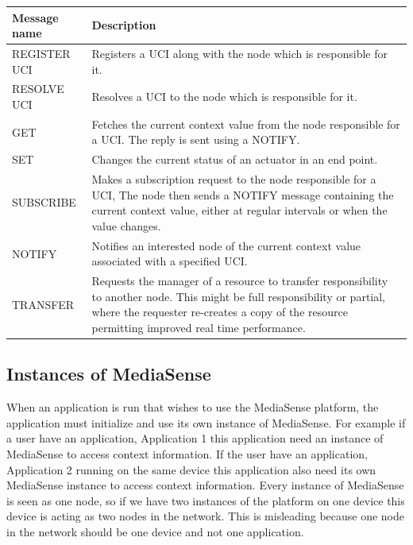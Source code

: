 \begin{center}
    \begin{tabular}{ | l | p{12cm} |}
    \hline
    Message name 		& 		Description \\ \hline
	REGISTER UCI 		& 		Registers a UCI along with the node which is responsible for it. \\ \hline
	RESOLVE UCI 		& 		Resolves a UCI to the node which is responsible for it. \\ \hline
	GET 				& 		Fetches the current context value from the node responsible for a UCI. The reply is sent using a NOTIFY. \\ \hline
	SET 				& 		Changes the current status of an actuator in an end point. \\ \hline
	SUBSCRIBE 			& 		Makes a subscription request to the node responsible for a UCI, The node then sends a NOTIFY message containing the current context value, either at regular intervals or when the value changes. \\ \hline
	NOTIFY 				& 		Notifies an interested node of the current context value associated with a specified UCI. \\ \hline
	TRANSFER 			& 		Requests the manager of a resource to transfer responsibility to another node. This might be full responsibility or partial, where the requester re-creates a copy of the resource permitting improved real time performance. \\ \hline
    \end{tabular}
\end{center}

\subsection{Instances of MediaSense}
When an application is run that wishes to use the MediaSense platform, the application must initialize and use its own instance of MediaSense. For example if a user have an application, Application 1 this application need an instance of MediaSense to access context information. If the user have an application, Application 2 running on the same device this application also need its own MediaSense instance to access context information. Every instance of MediaSense is seen as one node, so if we have two instances of the platform on one device this device is acting as two nodes in the network. This is misleading because one node in the network should be one device and not one application.

